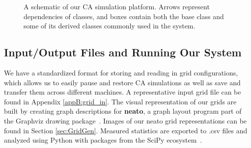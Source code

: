 \documentclass[a4paper,11pt,twoside]{report}
\begin{document}
\begin{figure}[htp]
\centering

\caption[CA Simulation Platform Architecture]{
	A schematic of our CA simulation platform. Arrows represent dependencies of classes, and boxes contain both the base class and some of its derived classes commonly used in the system.
}
\label{fig:sys_arch}
\end{figure}

\subsection{Input/Output Files and Running Our System}

We have a standardized format for storing and reading in grid configurations, which allows us to easily pause and restore CA simulations as well as save and transfer them across different machines. A representative input grid file can be found in Appendix \ref{appB:grid_in}. The visual representation of our grids are built by creating graph descriptions for \textbf{neato}, a graph layout program part of the Graphviz drawing package~\cite{el01}. Images of our neato grid representations can be found in Section \ref{sec:GridGen}. Measured statistics are exported to .csv files and analyzed using Python with packages from the SciPy ecosystem~\cite{jo14}.
\end{document}
